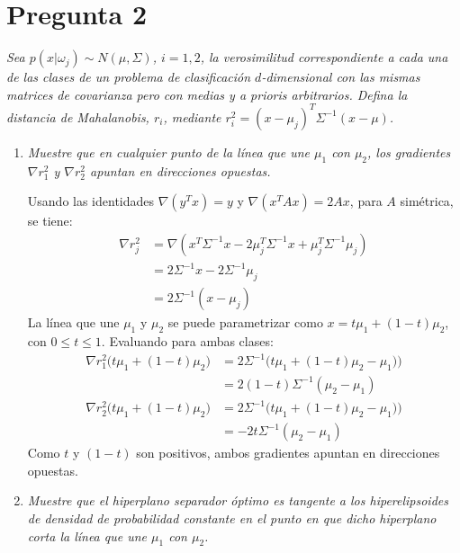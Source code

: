 \documentclass[spanish]{article}
\newcommand{\pregunta}{\textit}
\newcommand{\given}{\vert}
\begin{document}
\section*{Pregunta 2}
\pregunta{
    Sea $p(x\given\omega_j)\sim N(\mu, \Sigma)$, $i = 1, 2$, la verosimilitud correspondiente a cada
    una de las clases de un problema de clasificación $d$-dimensional con las mismas matrices de
    covarianza pero con medias y a prioris arbitrarios.  Defina la distancia de Mahalanobis, $r_i$,
    mediante $r_i^2 = (x - \mu_j)^T \Sigma^{-1} (x - \mu)$.
}
\begin{enumerate}
    \item \pregunta{Muestre que en cualquier punto de la línea que une $\mu_1$ con $\mu_2$, los
        gradientes $\nabla r_1^2$ y $\nabla r_2^2$ apuntan en direcciones opuestas.}

        Usando las identidades $\nabla(y^T x) = y$ y $\nabla(x^T Ax) = 2Ax$, para $A$ simétrica, se
        tiene:
        \begin{align}
            \nabla r_j^2 &= \nabla (x^T\Sigma^{-1}x - 2\mu_j^T\Sigma^{-1}x + \mu_j^T\Sigma^{-1}\mu_j) \\
                         &= 2\Sigma^{-1}x - 2\Sigma^{-1}\mu_ j \\
                         &= 2\Sigma^{-1} (x - \mu_j)
        \end{align}
        La línea que une $\mu_1$ y $\mu_2$ se puede parametrizar como $x = t\mu_1 + (1 - t)\mu_2$,
        con $0\le t\le 1$.  Evaluando para ambas clases:
        \begin{align}
            \nabla r_1^2\bigl(t\mu_1 + (1 - t)\mu_2\bigr)
                &= 2\Sigma^{-1}\bigl(t\mu_1 + (1 - t)\mu_2 - \mu_1)\bigr) \\
                &= 2 (1 - t)\Sigma^{-1} (\mu_2 - \mu_1) \\
            \nabla r_2^2\bigl(t\mu_1 + (1 - t)\mu_2\bigr)
                &= 2\Sigma^{-1}\bigl(t\mu_1 + (1 - t)\mu_2 - \mu_1)\bigr) \\
                &= -2t\Sigma^{-1} (\mu_2 - \mu_1)
        \end{align}
        Como $t$ y $(1 - t)$ son positivos, ambos gradientes apuntan en direcciones opuestas.

    \item \pregunta{Muestre que el hiperplano separador óptimo es tangente a los hiperelipsoides de
        densidad de probabilidad constante en el punto en que dicho hiperplano corta la línea que une 
        $\mu_1$ con $\mu_2$.}


\end{enumerate}
\end{document}
